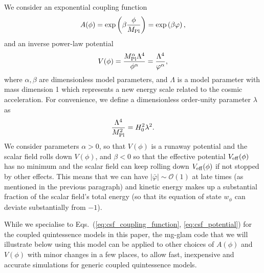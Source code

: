 We consider an exponential coupling function
\begin{equation}\label{eq:csf_coupling_function}
    A(\phi) = \exp\left(\beta\frac{\phi}{M_{\rm Pl}}\right) = \exp\left(\beta\varphi\right),
\end{equation}
and an inverse power-law potential
\begin{equation}\label{eq:csf_potential}
    V(\phi) = \frac{M^\alpha_{\rm Pl}\Lambda^4}{\phi^\alpha} = \frac{\Lambda^4}{\varphi^\alpha},
\end{equation}
where $\alpha,\beta$ are dimensionless model parameters, and $\Lambda$ is a model parameter with mass dimension 1 which represents a new energy scale related to the cosmic acceleration. For convenience, we define a dimensionless order-unity parameter $\lambda$ as
\begin{equation}\label{eq:csf_param_lambda}
    \frac{\Lambda^4}{M_{\rm Pl}^2} = H_0^2\lambda^2.
\end{equation}
We consider parameters $\alpha>0$, so that $V(\phi)$ is a runaway potential and the scalar field rolls down $V(\phi)$, and $\beta<0$ so that the effective potential $V_{\rm eff}(\phi)$ has no minimum and the scalar field can keep rolling down $V_{\rm eff}(\phi)$ if not stopped by other effects. This means that we can have $|\bar{\varphi}|\sim\mathcal{O}(1)$ at late times (as mentioned in the previous paragraph) and kinetic energy makes up a substantial fraction of the scalar field's total energy (so that its equation of state $w_\phi$ can deviate substantially from $-1$). 

While we specialise to Eqs.~(\ref{eq:csf_coupling_function}, \ref{eq:csf_potential}) for the coupled quintessence models in this paper, the {\sc mg}-{\sc glam} code that we will illustrate below using this model can be applied to other choices of $A(\phi)$ and $V(\phi)$ with minor changes in a few places, to allow fast, inexpensive and accurate simulations for generic coupled quintessence models.

